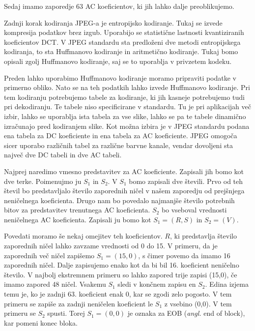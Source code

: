 \documentclass[a4paper,12pt,openright]{book}
\begin{document}
Sedaj imamo zaporedje 63 AC koeficientov, ki jih lahko dalje preoblikujemo.\par
Zadnji korak kodiranja JPEG-a je entropijsko kodiranje. Tukaj se izvede kompresija podatkov brez izgub. Uporabijo se statistične lastnosti kvantiziranih koeficientov DCT. V JPEG standardu sta predloženi dve metodi entropijskega kodiranja, to sta Huffmanovo kodiranje in aritmetično kodiranje. Tukaj bomo opisali zgolj Huffmanovo kodiranje, saj se to uporablja v privzetem kodeku.\par
Preden lahko uporabimo Huffmanovo kodiranje moramo pripraviti podatke v primerno obliko.
Nato se na teh podatkih lahko izvede Huffmanovo kodiranje. Pri tem kodiranju potrebujemo tabele za kodiranje, ki jih kasneje potrebujemo tudi pri dekodiranju. Te tabele niso specificirane v standardu. Tu je pri aplikacijah več izbir, lahko se uporablja ista tabela za vse slike, lahko se pa te tabele dinamično izračunajo pred kodiranjem slike. Kot možna izbira je v JPEG standardu podana ena tabela za DC koeficiente in ena tabela za AC koeficiente. JPEG omogoča sicer uporabo različnih tabel za različne barvne kanale, vendar dovoljeni sta največ dve DC tabeli in dve AC tabeli.\par
Najprej naredimo vmesno predstavitev za AC koeficiente. Zapisali jih bomo kot dve terke. Poimenujmo ju $S_1$ in $S_2$. V $S_1$ bomo zapisali dve števili. Prvo od teh števil bo predstavljalo število zaporednih ničel v našem zaporedju od prejšnjega neničelnega koeficienta. Drugo nam bo povedalo najmanjše število potrebnih bitov za predstavitev trenutnega AC koeficienta. $S_2$ bo vseboval vrednosti neničelnega AC koeficienta. Zapisali ju bomo kot $S_1 = (R, S)$ in $S_2 = (V)$.\par
Povedati moramo še nekaj omejitev teh koeficientov. $R$, ki predstavlja število zaporednih ničel lahko zavzame vrednosti od 0 do 15. V primeru, da je zaporednih več ničel zapišemo $S_1 = (15,0)$, s čimer povemo da imamo 16 zaporednih ničel. Dalje zapisujemo enako kot da bi bil 16. koeficient neničelno število. V najbolj ekstremnem primeru so lahko zapored trije zapisi (15,0), če imamo zapored 48 ničel. Vsakemu $S_1$ sledi v končnem zapisu en $S_2$. Edina izjema temu je, ko je zadnji 63. koeficient enak 0, kar se zgodi zelo pogosto. V tem primeru se zapiše za zadnji neničelen koeficient le $S_1$ z vsebino (0,0). V tem primeru se $S_2$ spusti. Torej $S_1 = (0,0)$ je oznaka za EOB (\textit{angl.} end of block), kar pomeni konec bloka.\par
\end{document}
